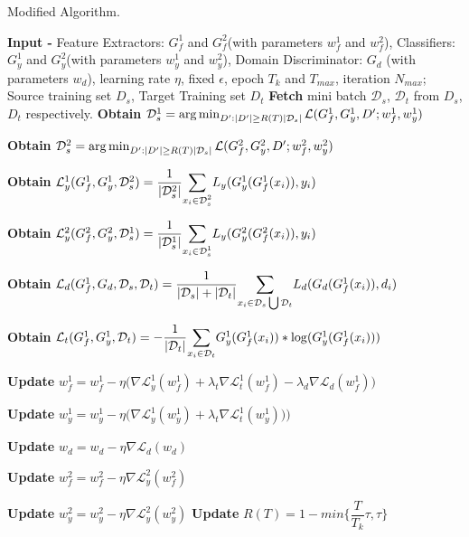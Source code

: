 \begin{algorithm}[H]
	\caption{Modified Algorithm.} 
	\begin{algorithmic}[1]
	    \State \textbf{Input -} Feature Extractors: $G_{f}^1$ and $G_{f}^2$(with parameters $w_{f}^1$ and $w_{f}^2$), Classifiers: $G_{y}^1$ and $G_{y}^2$(with parameters $w_{y}^1$ and $w_{y}^2$), Domain Discriminator: $G_d$ (with parameters $w_d$), learning rate $\eta$, fixed $\epsilon$, epoch $T_k$ and $T_{max}$, iteration $N_{max}$;
		    \State Source training set ${D_s}$, Target Training set ${D_t}$
				    \State \textbf{Fetch} mini batch $\mathcal{D}_s$, $\mathcal{D}_t$ from ${D_s}$, ${D_t}$ respectively.
				    \State \textbf{Obtain} $\mathcal{D}_{s}^1 = \operatorname*{arg\,min}_{D':|D'|\geq R(T)|\mathcal{D}_{s}|} \mathcal{L}(G_{f}^1, G_{y}^1, D'; w_{f}^1, w_{y}^1)$ 
				    
				    \State \textbf{Obtain} $\mathcal{D}_{s}^2 = \operatorname*{arg\,min}_{D':|D'|\geq R(T)|\mathcal{D}_{s}|} \mathcal{L}(G_{f}^2, G_{y}^2, D'; w_{f}^2, w_{y}^2)$
				
				    \State \textbf{Obtain} $\mathcal{L}_{y}^1(G_{f}^1, G_{y}^1,\mathcal{D}_{s}^2) =\dfrac{1}{|\mathcal{D}_{s}^2|} \mathlarger\sum\limits_{x_i \in \mathcal{D}_{s}^2} L_y(G_{y}^1(G_{f}^1(x_i)),y_i)$
				    
                    \State \textbf{Obtain} $\mathcal{L}_{y}^2(G_{f}^2, G_{y}^2, \mathcal{D}_{s}^1) =\dfrac{1}{|\mathcal{D}_{s}^1|} \mathlarger\sum\limits_{x_i \in \mathcal{D}_{s}^1} L_y(G_{y}^2(G_{f}^2(x_i)),y_i)$
				    
				    \State \textbf{Obtain} $\mathcal{L}_d(G_{f}^1, G_{d}, \mathcal{D}_s, \mathcal{D}_t) = \dfrac{1}{|\mathcal{D}_s| + |\mathcal{D}_t|} \mathlarger\sum\limits_{x_i \in \mathcal{D}_s \bigcup \mathcal{D}_t} L_d(G_d(G_{f}^1(x_i)), d_i)$
				    
				    \State \textbf{Obtain} $\mathcal{L}_t(G_{f}^1, G_{y}^1, \mathcal{D}_t) = - \dfrac{1}{|\mathcal{D}_t|} \mathlarger\sum\limits_{x_i \in \mathcal{D}_t} G_{y}^1(G_{f}^1(x_i))*\log(G_{y}^1(G_{f}^1(x_i)))$
				    
				    \State \textbf{Update} $w_{f}^1 = w_{f}^1 - \eta \big( \nabla \mathcal{L}_{y}^1(w_{f}^1) + \lambda_t \nabla \mathcal{L}_{t}^1(w_{f}^1) - \lambda_d \nabla \mathcal{L}_{d}(w_{f}^1)\big)$
				    
				    \State \textbf{Update} $w_{y}^1 = w_{y}^1 - \eta \big(\nabla \mathcal{L}_{y}^1(w_{y}^1)+ \lambda_t \nabla\mathcal{L}_{t}^1(w_{y}^1))\big)$
				    
				    \State \textbf{Update} $w_{d} = w_{d} - \eta \nabla \mathcal{L}_{d}(w_{d})$
				    
				    \State \textbf{Update} $w_{f}^2 = w_{f}^2 - \eta \nabla \mathcal{L}_{y}^2(w_{f}^2)$
				    
				    \State \textbf{Update} $w_{y}^2 = w_{y}^2 - \eta \nabla \mathcal{L}_{y}^2(w_{y}^2)$
			    \EndFor
			 \State \textbf{Update} $R(T)= 1- min\bigg\{\dfrac{T}{T_k}\tau, \tau\bigg\}$
	\EndFor
	\end{algorithmic} 
\end{algorithm}
